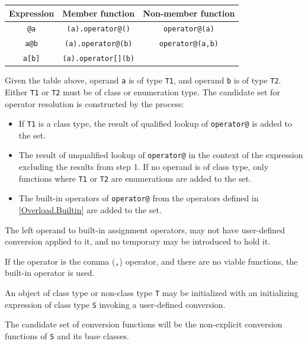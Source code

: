 \begin{center}
\begin{tabular}{|| c | c | c ||}
\hline
  Expression & Member function   & Non-member function \\
\hline
  \texttt{@a}   & \texttt{(a).operator@()}   & \texttt{operator@(a)}   \\
  \texttt{a@b}  & \texttt{(a).operator@(b)}  & \texttt{operator@(a,b)} \\
  \texttt{a[b]} & \texttt{(a).operator[](b)} &  \\
\hline
\end{tabular}
\end{center}

\p Given the table above, operand \texttt{a} is of type \texttt{T1}, and operand
\texttt{b} is of type \texttt{T2}. Either \texttt{T1} or \texttt{T2} must be of
class or enumeration type. The candidate set for operator resolution is
constructed by the process:

\begin{itemize}
\item If \texttt{T1} is a class type, the result of qualified lookup of \texttt{operator@} is
  added to the set.
\item The result of unqualified lookup of \texttt{operator@} in the context of the
  expression excluding the results from step 1. If no operand is of class type,
  only functions where \texttt{T1} or \texttt{T2} are enumerations are added to the set.
\item The built-in operators of \texttt{operator@} from the operators defined in
  \ref{Overload.Builtin} are added to the set.
\end{itemize}

\p The left operand to built-in assignment operators, may not have user-defined
conversion applied to it, and no temporary may be introduced to hold it.

\p If the operator is the comma (\texttt{,}) operator, and there are no viable functions, the
built-in operator is used.


\p An object of class type or non-class type \texttt{T} may be initialized with an
initializing expression of class type \texttt{S} invoking a user-defined conversion.

\p The candidate set of conversion functions will be the non-explicit conversion
functions of \texttt{S} and its base classes.

